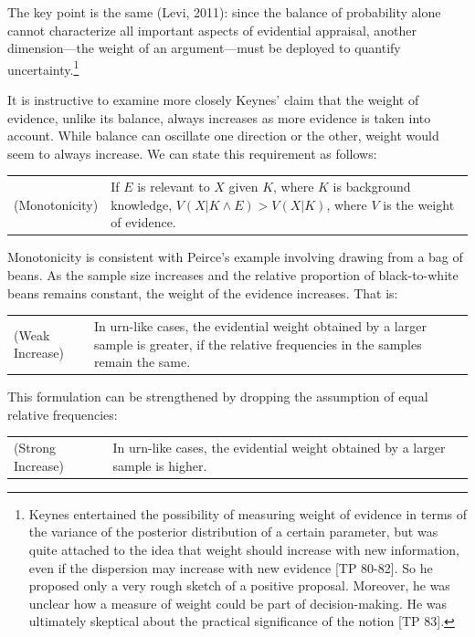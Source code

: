 \documentclass[
  10pt,
  dvipsnames,enabledeprecatedfontcommands]{scrartcl}
\begin{document}
\noindent The key point is the same (Levi, 2011): since the balance of
probability alone cannot characterize all important aspects of
evidential appraisal, another dimension---the weight of an
argument---must be deployed to quantify uncertainty.\footnote{Keynes
  entertained the possibility of measuring weight of evidence in terms
  of the variance of the posterior distribution of a certain parameter,
  but was quite attached to the idea that weight should increase with
  new information, even if the dispersion may increase with new evidence
  {[}TP 80-82{]}. So he proposed only a very rough sketch of a positive
  proposal. Moreover, he was unclear how a measure of weight could be
  part of decision-making. He was ultimately skeptical about the
  practical significance of the notion {[}TP 83{]}.}

It is instructive to examine more closely Keynes' claim that the weight
of evidence, unlike its balance, always increases as more evidence is
taken into account. While balance can oscillate one direction or the
other, weight would seem to always increase. We can state this
requirement as follows:

\vspace{1mm}
\begin{tabular}{lp{9cm}}
(Monotonicity) & If $E$ is relevant to $X$ given $K$, where $K$ is background knowledge, $V(X\vert K \wedge E) > V(X\vert K)$, where $V$ is the weight of evidence.
\end{tabular}
\vspace{1mm}

\noindent Monotonicity is consistent with Peirce's example involving
drawing from a bag of beans. As the sample size increases and the
relative proportion of black-to-white beans remains constant, the weight
of the evidence increases. That is:

\vspace{1mm}
\begin{tabular}{p{3cm}p{10cm}}
(Weak Increase) & In urn-like cases, the evidential weight obtained by a larger sample is greater, if the relative frequencies in the samples remain the same.
\end{tabular}
\vspace{1mm}

\noindent This formulation can be strengthened by dropping the
assumption of equal relative frequencies:

\vspace{1mm}
\begin{tabular}{p{3cm}p{10cm}}
(Strong Increase) & In urn-like cases, the evidential weight obtained by a larger sample is higher.
\end{tabular}
\end{document}
